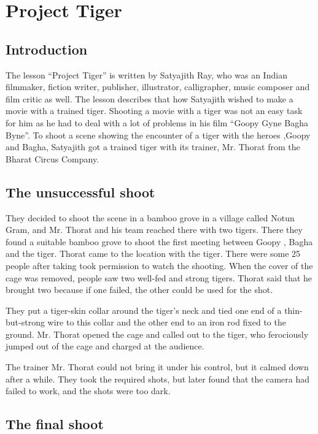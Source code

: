 \documentclass[a4paper,12pt]{book}
\begin{document}
\chapter{Project Tiger}
\label{sec:org58db9b3}

\section{Introduction}
\label{sec:orgd14fc08}

The lesson “Project Tiger” is written by Satyajith Ray, who was an Indian filmmaker, fiction writer, publisher, illustrator, calligrapher, music composer and film critic as well. The lesson describes that how Satyajith wished to make a movie with a trained tiger. Shooting a movie with a tiger was not an easy task for him as he had to deal with a lot of problems in his film “Goopy Gyne Bagha Byne”. To shoot a scene showing the encounter of a tiger with the heroes ,Goopy and Bagha, Satyajith got a trained tiger with its trainer, Mr. Thorat from the Bharat Circus Company.

\section{The unsuccessful shoot}
\label{sec:org6fc4c6f}

They decided to shoot the scene in a bamboo grove in a village called Notun Gram, and Mr. Thorat and his team reached there with two tigers. There they found a suitable bamboo grove to shoot the first meeting between Goopy , Bagha and the tiger. Thorat came to the location with the tiger. There were some 25 people after taking took permission to watch the shooting. When the cover of the cage was removed, people saw two well-fed and strong tigers. Thorat said that he brought two because if one failed, the other could be used for the shot.

They put a tiger-skin collar around the tiger’s neck and tied one end of a thin- but-strong wire to this collar and the other end to an iron rod fixed to the ground. Mr. Thorat opened the cage and called out to the tiger, who ferociously jumped out of the cage and charged at the audience.

The trainer Mr. Thorat could not bring it under his control, but it calmed down after a while. They took the required shots, but later found that the camera had failed to work, and the shots were too dark.

\section{The final shoot}
\label{sec:orgecc11f3}
\end{document}
